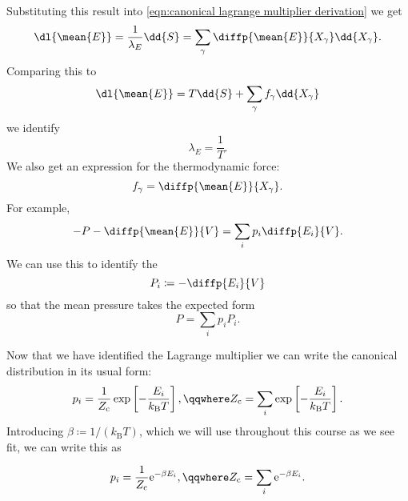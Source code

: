 \documentclass[fleqn]{NotesClass}
\newcommand*{\boltzmann}{k_{\mathrm{B}}}
\newcommand*{\cpartition}{Z_{\mathrm{c}}}
\newcommand*{\e}{\mathrm{e}}
\begin{document}
    Substituting this result into \cref{eqn:canonical lagrange multiplier derivation} we get
    \begin{equation}
        \dl{\mean{E}} = \frac{1}{\lambda_E} \dd{S} = \sum_\gamma \diffp{\mean{E}}{X_\gamma} \dd{X_\gamma}.
    \end{equation}
    Comparing this to
    \begin{equation}
        \dl{\mean{E}} = T \dd{S} + \sum_\gamma f_\gamma \dd{X_\gamma}
    \end{equation}
    we identify
    \begin{equation}
        \lambda_E = \frac{1}{T}.
    \end{equation}
    We also get an expression for the thermodynamic force:
    \begin{equation}\label{eqn: f = dE/dX}
        f_\gamma = \diffp{\mean{E}}{X_\gamma}.
    \end{equation}
    For example,
    \begin{equation}
        -P - \diffp{\mean{E}}{V} = \sum_i p_i \diffp{E_i}{V}.
    \end{equation}
    We can use this to identify the 
    \begin{equation}
        P_i \coloneqq - \diffp{E_i}{V}
    \end{equation}
    so that the mean pressure takes the expected form
    \begin{equation}
        P = \sum_i p_i P_i.
    \end{equation}
    
    Now that we have identified the Lagrange multiplier we can write the canonical distribution in its usual form:
    \begin{equation}
        p_i = \frac{1}{\cpartition} \exp\left[ -\frac{E_i}{\boltzmann T} \right], \qqwhere \cpartition = \sum_i \exp\left[ -\frac{E_i}{\boltzmann T} \right].
    \end{equation}
    Introducing \(\beta \coloneqq 1/(\boltzmann T)\), which we will use throughout this course as we see fit, we can write this as
    \begin{important}
        \vspace{-2.5ex}
        \begin{equation}
            p_i = \frac{1}{\cpartition} \e^{-\beta E_i}, \qqwhere \cpartition = \sum_i \e^{-\beta E_i}.
        \end{equation}
    \end{important}
    
\end{document}

